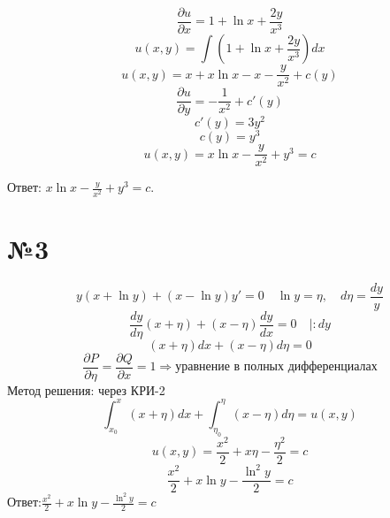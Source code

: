 \documentclass{article}
\begin{document}
\begin{equation*}
    \frac{\partial u}{\partial x} = 1+\ln x+\frac{2y}{x^3}
\end{equation*}
\begin{equation*}
    u(x,y)= \int \left(1+\ln x+\frac{2y}{x^3}\right)dx
\end{equation*}
\begin{equation*}
    u(x,y)= x+x\ln x-x-\frac{y}{x^2}+c(y)
\end{equation*}
\begin{equation*}
    \frac{\partial u}{\partial y} = -\frac{1}{x^2}+c'(y)
\end{equation*}
\begin{equation*}
    c'(y)=3y^2
\end{equation*}
\begin{equation*}
    c(y)=y^3
\end{equation*}
\begin{equation*}
    u(x,y)=x\ln x-\frac{y}{x^2}+y^3=c
\end{equation*}

Ответ: $x\ln x-\frac{y}{x^2}+y^3=c$.

\section*{№3}
\begin{equation*}
    y(x+\ln y)+(x-\ln y)y'=0 \quad \ln y = \eta, \quad d\eta=\frac{dy}{y}
\end{equation*}
\begin{equation*}
    \frac{dy}{d\eta}(x+\eta)+(x-\eta)\frac{dy}{dx}=0 \quad |:dy
\end{equation*}
\begin{equation*}
    (x+\eta)dx+(x-\eta)d\eta=0
\end{equation*}
\begin{equation*}
    \frac{\partial P}{\partial \eta}=\frac{\partial Q}{\partial x}=1 \Rightarrow \text{уравнение в полных дифференциалах}
\end{equation*}
Метод решения: через КРИ-2
\begin{equation*}
    \int_{x_0}^{x}(x+\eta)dx+\int_{\eta_0}^{\eta}(x-\eta)d\eta=u(x,y)
\end{equation*}
\begin{equation*}
    u(x,y)=\frac{x^2}{2}+x\eta-\frac{\eta^2}{2}=c
\end{equation*}
\begin{equation*}
    \frac{x^2}{2}+x\ln y-\frac{\ln^2{y}}{2}=c
\end{equation*}
Ответ:$\frac{x^2}{2}+x\ln y-\frac{\ln^2{y}}{2}=c$
\end{document}
